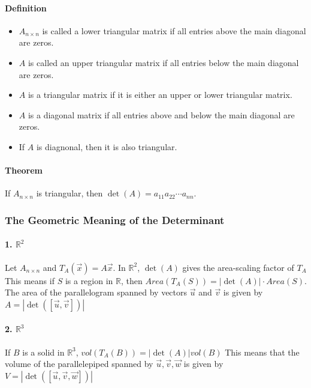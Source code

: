\paragraph*{Definition}
\begin{itemize}
    \item $A_{n \times n}$ is called a lower triangular matrix if all entries above the main diagonal are zeros. 
    \item $A$ is called an upper triangular matrix if all entries below the main diagonal are zeros.
    \item $A$ is a triangular matrix if it is either an upper or lower triangular matrix.
    \item $A$ is a diagonal matrix if all entries above and below the main diagonal are zeros.
    \item If $A$ is diagnonal, then it is also triangular.
\end{itemize}

\paragraph*{Theorem}
If $A_{n \times n}$ is triangular, then $\det(A) = a_{11}a_{22} \cdots a_{nn}$.

\subsubsection*{The Geometric Meaning of the Determinant}
\paragraph*{1. $\mathbb{R}^2$}
Let $A_{n \times n}$ and $T_A(\vec{x}) = A\vec{x}$. In $\mathbb{R}^2$, $\det(A)$ gives the area-scaling factor of $T_A$
This means if $S$ is a region in $\mathbb{R}$, then $Area(T_A(S)) = |\det(A)| \cdot Area(S)$. The area of the parallelogram spanned by 
vectors $\vec{u}$ and $\vec{v}$ is given by $A = |\det([\vec{u}, \vec{v}])|$

\paragraph*{2. $\mathbb{R}^3$}
If $B$ is a solid in $\mathbb{R}^3$, $vol(T_A(B)) = |\det(A)|vol(B)$
This means that the volume of the parallelepiped spanned by $\vec{u}, \vec{v}, \vec{w}$ is given by $V = |\det([\vec{u}, \vec{v}, \vec{w}])|$

